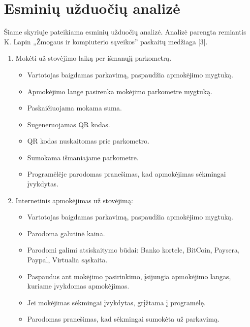 \documentclass{VUMIFPSkursinis}
\begin{document}
\section{Esminių užduočių analizė}
Šiame skyriuje pateikiama esminių užduočių analizė. Analizė parengta remiantis K. Lapin „Žmogaus ir kompiuterio sąveikos” paskaitų medžiaga [3]. 
\begin{enumerate}
	\item Mokėti už stovėjimo laiką per išmanųjį parkometrą.
		\begin{itemize}
			\item Vartotojas baigdamas parkavimą, paspaudžia apmokėjimo mygtuką.
			\item Apmokėjimo lange pasirenka mokėjimo parkometre mygtuką.
			\item Paskaičiuojama mokama suma.
			\item Sugeneruojamas QR kodas.
			\item QR kodas nuskaitomas prie parkometro.
			\item Sumokama išmaniajame parkometre.
			\item Programėlėje parodomas pranešimas, kad apmokėjimas sėkmingai įvykdytas.
		\end{itemize}
	\item Internetinis apmokėjimas už stovėjimą:
		\begin{itemize}
			\item Vartotojas baigdamas parkavimą, paspaudžia apmokėjimo mygtuką.
			\item Parodoma galutinė kaina.
			\item Parodomi galimi atsiskaitymo būdai: Banko kortele, BitCoin, Paysera, Paypal, Virtualia sąskaita.
			\item Paspaudus ant mokėjimo pasirinkimo, įsijungia apmokėjimo langas, kuriame įvykdomas apmokėjimas.
			\item Jei mokėjimas sėkmingai įvykdytas, grįžtama į programėlę.
			\item Parodomas pranešimas, kad sėkmingai sumokėta už parkavimą.


\end{itemize}
\end{enumerate}
\end{document}

